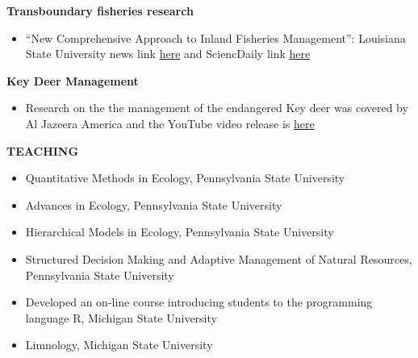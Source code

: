 \documentclass[10pt]{article}
\begin{document}
\begin{flushleft}
\textbf{Transboundary fisheries research}\\
\begin{itemize}
\item ``New Comprehensive Approach to Inland Fisheries Management'': Louisiana State University news link \href{http://www.lsu.edu/mediacenter/news/2016/09/13docs_midway_transfish.php}{here} and SciencDaily link \href{https://www.sciencedaily.com/releases/2016/09/160914130706.htm}{here}\\
\end{itemize}

\textbf{Key Deer Management}\\
\begin{itemize}
\vspace{5pt}
\item Research on the the management of the endangered Key deer was covered by Al Jazeera America and the YouTube video release is \href{http://www.youtube.com/watch?v=r6GX7tZiPFk}{here}\\
\vspace{5pt}
\end{itemize}



\vspace{8pt}
\centerline {\bf{TEACHING}}
\vspace{5pt}
\begin{itemize}
\item Quantitative Methods in Ecology, Pennsylvania State University\\
\item Advances in Ecology, Pennsylvania State University\\
\item Hierarchical Models in Ecology, Pennsylvania State University\\
\item Structured Decision Making and Adaptive Management of Natural Resources, Pennsylvania State University\\
\item Developed an on-line course introducing students to the programming language R, Michigan State University\\
\item Limnology, Michigan State University\\
\end{itemize}


\end{flushleft}
\end{document}
